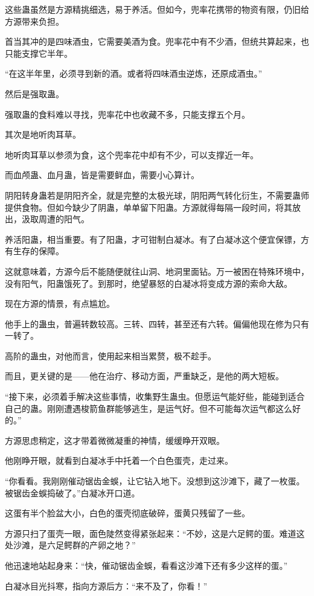 \begin{this_body}
这些蛊虽然是方源精挑细选，易于养活。但如今，兜率花携带的物资有限，仍旧给方源带来负担。

首当其冲的是四味酒虫，它需要美酒为食。兜率花中有不少酒，但统共算起来，也只能支撑它半年。

“在这半年里，必须寻到新的酒。或者将四味酒虫逆炼，还原成酒虫。”

然后是强取蛊。

强取蛊的食料难以寻找，兜率花中也收藏不多，只能支撑五个月。

其次是地听肉耳草。

地听肉耳草以参须为食，这个兜率花中却有不少，可以支撑近一年。

而血颅蛊、血月蛊，皆是需要鲜血，需要小心算计。

阴阳转身蛊若是阴阳齐全，就是完整的太极光球，阴阳两气转化衍生，不需要蛊师提供食物。但如今缺少了阴蛊，单单留下阳蛊。方源就得每隔一段时间，将其放出，汲取周遭的阳气。

养活阳蛊，相当重要。有了阳蛊，才可钳制白凝冰。有了白凝冰这个便宜保镖，方有生存的保障。

这就意味着，方源今后不能随便就往山洞、地洞里面钻。万一被困在特殊环境中，没有阳气，阳蛊饿死了。到那时，绝望暴怒的白凝冰将变成方源的索命大敌。

现在方源的情景，有点尴尬。

他手上的蛊虫，普遍转数较高。三转、四转，甚至还有六转。偏偏他现在修为只有一转了。

高阶的蛊虫，对他而言，使用起来相当累赘，极不趁手。

而且，更关键的是——他在治疗、移动方面，严重缺乏，是他的两大短板。

“接下来，必须着手解决这些事情，收集野生蛊虫。但愿运气能好些，能碰到适合自己的蛊。刚刚遭遇梭箭鱼群能够逃生，是运气好。但不可能每次运气都这么好的。”

方源思虑稍定，这才带着微微凝重的神情，缓缓睁开双眼。

他刚睁开眼，就看到白凝冰手中托着一个白色蛋壳，走过来。

“你看看。我刚刚催动锯齿金蜈，让它钻入地下。没想到这沙滩下，藏了一枚蛋。被锯齿金蜈捣破了。”白凝冰开口道。

这蛋有半个脸盆大小，白色的蛋壳彻底破碎，蛋黄只残留了一些。

方源只扫了蛋壳一眼，面色陡然变得紧张起来：“不妙，这是六足鳄的蛋。难道这处沙滩，是六足鳄群的产卵之地？”

他迅速地站起身来：“快，催动锯齿金蜈，看看这沙滩下还有多少这样的蛋。”

白凝冰目光抖寒，指向方源后方：“来不及了，你看！”


\end{this_body}
